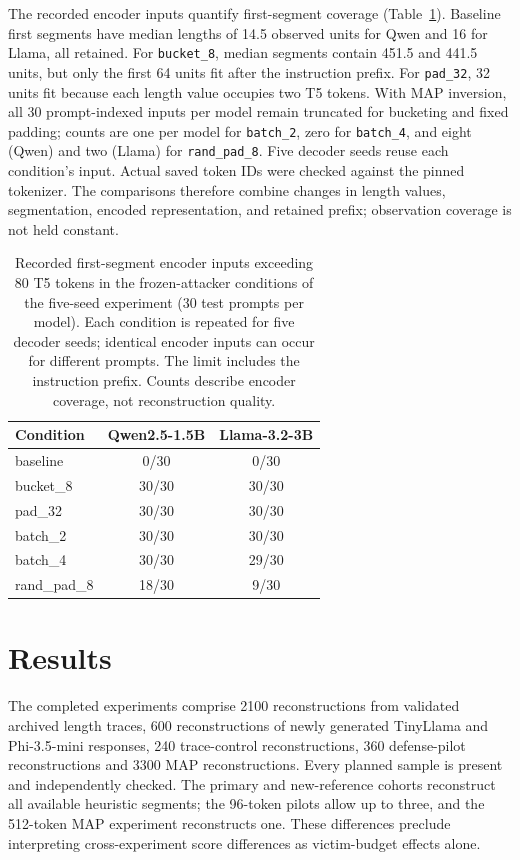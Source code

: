 \documentclass[electronics,article,submit,pdftex,moreauthors]{Definitions/mdpi}
\begin{document}
The recorded encoder inputs quantify first-segment coverage (Table~\ref{tab:encoder_coverage}). Baseline first segments have median lengths of 14.5 observed units for Qwen and 16 for Llama, all retained. For \texttt{bucket\_8}, median segments contain 451.5 and 441.5 units, but only the first 64 units fit after the instruction prefix. For \texttt{pad\_32}, 32 units fit because each length value occupies two T5 tokens. With MAP inversion, all 30 prompt-indexed inputs per model remain truncated for bucketing and fixed padding; counts are one per model for \texttt{batch\_2}, zero for \texttt{batch\_4}, and eight (Qwen) and two (Llama) for \texttt{rand\_pad\_8}. Five decoder seeds reuse each condition's input. Actual saved token IDs were checked against the pinned tokenizer. The comparisons therefore combine changes in length values, segmentation, encoded representation, and retained prefix; observation coverage is not held constant.

\begin{table}[ht]
\centering
\caption{Recorded first-segment encoder inputs exceeding 80 T5 tokens in the frozen-attacker conditions of the five-seed experiment (30 test prompts per model). Each condition is repeated for five decoder seeds; identical encoder inputs can occur for different prompts. The limit includes the instruction prefix. Counts describe encoder coverage, not reconstruction quality.}
\label{tab:encoder_coverage}
\begin{tabular}{l c c}
\toprule
Condition & Qwen2.5-1.5B & Llama-3.2-3B \\
\midrule
baseline & 0/30 & 0/30 \\
bucket\_8 & 30/30 & 30/30 \\
pad\_32 & 30/30 & 30/30 \\
batch\_2 & 30/30 & 30/30 \\
batch\_4 & 30/30 & 29/30 \\
rand\_pad\_8 & 18/30 & 9/30 \\
\bottomrule
\end{tabular}
\end{table}

\section{Results}
The completed experiments comprise 2100 reconstructions from validated archived length traces, 600 reconstructions of newly generated TinyLlama and Phi-3.5-mini responses, 240 trace-control reconstructions, 360 defense-pilot reconstructions and 3300 MAP reconstructions. Every planned sample is present and independently checked. The primary and new-reference cohorts reconstruct all available heuristic segments; the 96-token pilots allow up to three, and the 512-token MAP experiment reconstructs one. These differences preclude interpreting cross-experiment score differences as victim-budget effects alone.
\end{document}
